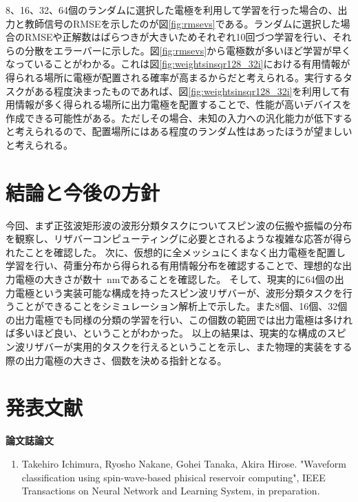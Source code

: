 \documentclass[a4j, twocolumn]{jsarticle}
\begin{document}
8、16、32、64個のランダムに選択した電極を利用して学習を行った場合の、出力と教師信号のRMSEを示したのが図\ref{fig:rmsevs}である。ランダムに選択した場合のRMSEや正解数はばらつきが大きいためそれぞれ10回づつ学習を行い、それらの分散をエラーバーに示した。図\ref{fig:rmsevs}から電極数が多いほど学習が早くなっていることがわかる。これは図\ref{fig:weightsinsqr128_32i}における有用情報が得られる場所に電極が配置される確率が高まるからだと考えられる。実行するタスクがある程度決まったものであれば、図\ref{fig:weightsinsqr128_32i}を利用して有用情報が多く得られる場所に出力電極を配置することで、性能が高いデバイスを作成できる可能性がある。ただしその場合、未知の入力への汎化能力が低下すると考えられるので、配置場所にはある程度のランダム性はあったほうが望ましいと考えられる。

\section{結論と今後の方針}
\label{sec:conclusion}
今回、まず正弦波矩形波の波形分類タスクについてスピン波の伝搬や振幅の分布を観察し、リザバーコンピューティングに必要とされるような複雑な応答が得られたことを確認した。
次に、仮想的に全メッシュにくまなく出力電極を配置し学習を行い、荷重分布から得られる有用情報分布を確認することで、理想的な出力電極の大きさが数十~nmであることを確認した。
そして、現実的に64個の出力電極という実装可能な構成を持ったスピン波リザバーが、波形分類タスクを行うことができることをシミュレーション解析上で示した。また8個、16個、32個の出力電極でも同様の分類の学習を行い、この個数の範囲では出力電極は多ければ多いほど良い、ということがわかった。
以上の結果は、現実的な構成のスピン波リザバーが実用的タスクを行えるということを示し、また物理的実装をする際の出力電極の大きさ、個数を決める指針となる。





\section*{発表文献}
{\bf 論文誌論文}
\begin{enumerate}
\item Takehiro Ichimura, Ryosho Nakane, Gohei Tanaka, Akira Hirose. "Waveform classification using spin-wave-based phisical reservoir computing", IEEE Transactions on Neural Network and Learning System, in preparation.
\end{enumerate}
\end{document}
